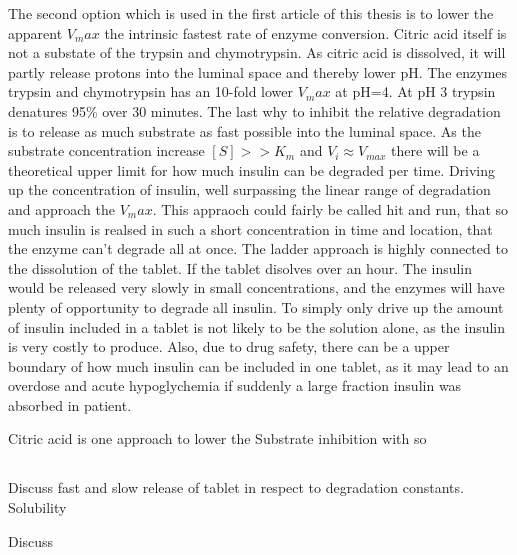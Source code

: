 The second option which is used in the first article \cite{welling2014citric} of this thesis is to lower the apparent $V_max$ the intrinsic fastest rate of enzyme conversion. Citric acid itself is not a substate of the trypsin and chymotrypsin. As citric acid is dissolved, it will partly release protons into the luminal space and thereby lower pH. The enzymes trypsin and chymotrypsin has an 10-fold lower $V_max$ at pH=4. At pH 3 trypsin denatures 95\% over 30 minutes.
The last why to inhibit the relative degradation is to release as much substrate as fast possible into the luminal space. As the substrate concentration increase $[S] >> K_m$ and $V_i \approx V_{max}$ there will be a theoretical upper limit for how much insulin can be degraded per time. Driving up the concentration of insulin, well surpassing the linear range of degradation and approach the $V_max$. This appraoch could fairly be called hit and run, that so much insulin is realsed in such a short concentration in time and location, that the enzyme can't degrade all at once. The ladder approach is highly connected to the dissolution of the tablet. If the tablet disolves over an hour. The insulin would be released very slowly in small concentrations, and the enzymes will have plenty of opportunity to degrade all insulin. To simply only drive up the amount of insulin included in a tablet is not likely to be the solution alone, as the insulin is very costly to produce. Also, due to drug safety, there can be a upper boundary of how much insulin can be included in one tablet, as it may lead to an overdose and acute hypoglychemia if suddenly a large fraction insulin was absorbed in patient.

Citric acid is one approach to lower the 
Substrate inhibition with so


\subsection{}

\newpage




Discuss fast and slow release of tablet in respect to degradation constants. Solubility

Discuss 